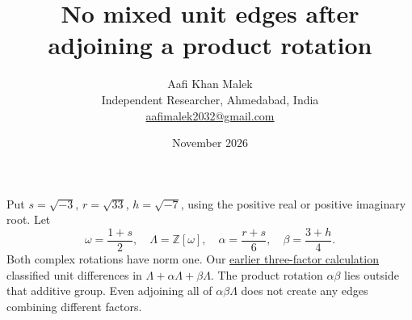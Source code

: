 \documentclass[11pt,letterpaper]{article}
\title{No mixed unit edges after adjoining a product rotation}
\author{Aafi Khan Malek\\\small Independent Researcher, Ahmedabad, India\\
\small\href{mailto:aafimalek2032@gmail.com}{aafimalek2032@gmail.com}}
\date{November 2026}
\begin{document}
\maketitle
Put \(s=\sqrt{-3}\), \(r=\sqrt{33}\), \(h=\sqrt{-7}\), using
the positive real or positive imaginary root. Let
\[
 \omega=\frac{1+s}{2},\quad \Lambda=\mathbb Z[\omega],\quad
 \alpha=\frac{r+s}{6},\quad \beta=\frac{3+h}{4}.
\]
Both complex rotations have norm one. Our
\href{https://github.com/Aafimalek/novel-discoveries/tree/8be0f5af188954944d37043740b20aeaf1a0c2bf/hadwiger-nelson/verification/parts-native-field-obstruction/mixed-additive-lattice}{earlier three-factor calculation}
classified unit differences in \(\Lambda+\alpha\Lambda+\beta\Lambda\).
The product rotation \(\alpha\beta\) lies outside that additive
group. Even adjoining all of \(\alpha\beta\Lambda\) does not
create any edges combining different factors.
\end{document}
